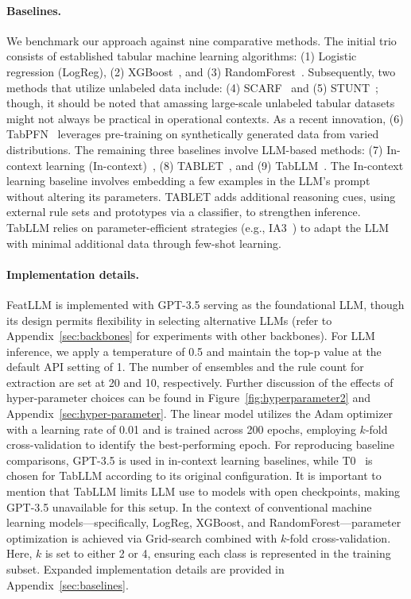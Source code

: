 \vspace*{-0.12in}
\paragraph{Baselines.}
We benchmark our approach against nine comparative methods. The initial trio consists of established tabular machine learning algorithms: (1) Logistic regression (LogReg), (2) XGBoost~\cite{chen2016xgboost}, and (3) RandomForest~\cite{ho1995random}. Subsequently, two methods that utilize unlabeled data include: (4) SCARF~\cite{bahri2022scarf} and (5) STUNT~\cite{nam2023stunt}; though, it should be noted that amassing large-scale unlabeled tabular datasets might not always be practical in operational contexts. As a recent innovation, (6) TabPFN~\cite{hollmann2022tabpfn} leverages pre-training on synthetically generated data from varied distributions. The remaining three baselines involve LLM-based methods: (7) In-context learning (In-context)~\cite{wei2022emergent}, (8) TABLET~\cite{slack2023tablet}, and (9) TabLLM~\cite{hegselmann2023tabllm}. The In-context learning baseline involves embedding a few examples in the LLM’s prompt without altering its parameters. TABLET adds additional reasoning cues, using external rule sets and prototypes via a classifier, to strengthen inference. TabLLM relies on parameter-efficient strategies (e.g., IA3~\cite{liu2022few}) to adapt the LLM with minimal additional data through few-shot learning.

\vspace*{-0.12in}
\paragraph{Implementation details.}
\textsf{FeatLLM} is implemented with GPT-3.5 serving as the foundational LLM, though its design permits flexibility in selecting alternative LLMs (refer to Appendix~\ref{sec:backbones} for experiments with other backbones). For LLM inference, we apply a temperature of 0.5 and maintain the top-p value at the default API setting of 1. The number of ensembles and the rule count for extraction are set at 20 and 10, respectively. Further discussion of the effects of hyper-parameter choices can be found in Figure~\ref{fig:hyperparameter2} and Appendix~\ref{sec:hyper-parameter}. The linear model utilizes the Adam optimizer with a learning rate of 0.01 and is trained across 200 epochs, employing $k$-fold cross-validation to identify the best-performing epoch. For reproducing baseline comparisons, GPT-3.5 is used in in-context learning baselines, while T0~\cite{sanh2022multitask} is chosen for TabLLM according to its original configuration. It is important to mention that TabLLM limits LLM use to models with open checkpoints, making GPT-3.5 unavailable for this setup. In the context of conventional machine learning models—specifically, LogReg, XGBoost, and RandomForest—parameter optimization is achieved via Grid-search combined with $k$-fold cross-validation. Here, $k$ is set to either 2 or 4, ensuring each class is represented in the training subset. Expanded implementation details are provided in Appendix~\ref{sec:baselines}.

